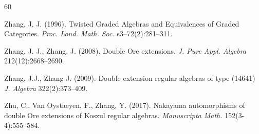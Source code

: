 \documentclass{amsart}
\theoremstyle{definition}
\theoremstyle{remark}
\numberwithin{equation}{section}
\begin{document}
\begin{thebibliography}{60}







 Zhang, J. J. (1996). Twisted {G}raded {A}lgebras and {E}quivalences of {G}raded {C}ategories. {\em Proc. Lond. Math. Soc.} s3--72(2):281--311.

 Zhang, J. J., Zhang, J. (2008). Double Ore extensions. {\em J. Pure Appl. Algebra} 212(12):2668--2690.

 Zhang, J.J., Zhang J. (2009). Double extension regular algebras of type (14641) {\em J. Algebra} 322(2):373--409.

 Zhu, C., Van Oystaeyen, F., Zhang, Y. (2017). Nakayama automorphisms of double Ore extensions of Koszul regular algebras. {\em Manuscripta Math.} 152(3-4):555--584.

\end{thebibliography}
\end{document}
